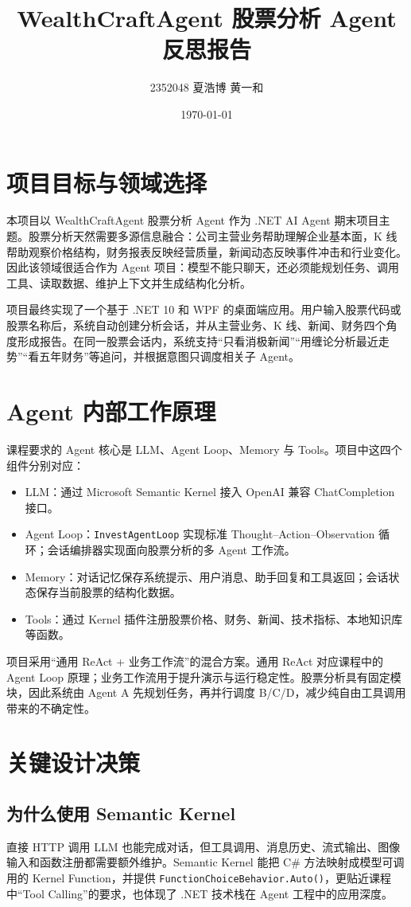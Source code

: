 \documentclass[UTF8,a4paper,11pt]{ctexart}
\title{\heiti WealthCraftAgent 股票分析 Agent 反思报告}
\author{2352048 夏浩博 \quad 2351269 黄一和}
\date{\today}
\begin{document}
\maketitle

\section{项目目标与领域选择}
本项目以 WealthCraftAgent 股票分析 Agent 作为 .NET AI Agent 期末项目主题。股票分析天然需要多源信息融合：公司主营业务帮助理解企业基本面，K 线帮助观察价格结构，财务报表反映经营质量，新闻动态反映事件冲击和行业变化。因此该领域很适合作为 Agent 项目：模型不能只聊天，还必须能规划任务、调用工具、读取数据、维护上下文并生成结构化分析。

项目最终实现了一个基于 .NET 10 和 WPF 的桌面端应用。用户输入股票代码或股票名称后，系统自动创建分析会话，并从主营业务、K 线、新闻、财务四个角度形成报告。在同一股票会话内，系统支持“只看消极新闻”“用缠论分析最近走势”“看五年财务”等追问，并根据意图只调度相关子 Agent。

\section{Agent 内部工作原理}
课程要求的 Agent 核心是 LLM、Agent Loop、Memory 与 Tools。项目中这四个组件分别对应：

\begin{itemize}
  \item LLM：通过 Microsoft Semantic Kernel 接入 OpenAI 兼容 ChatCompletion 接口。
  \item Agent Loop：\texttt{InvestAgentLoop} 实现标准 Thought--Action--Observation 循环；会话编排器实现面向股票分析的多 Agent 工作流。
  \item Memory：对话记忆保存系统提示、用户消息、助手回复和工具返回；会话状态保存当前股票的结构化数据。
  \item Tools：通过 Kernel 插件注册股票价格、财务、新闻、技术指标、本地知识库等函数。
\end{itemize}

项目采用“通用 ReAct + 业务工作流”的混合方案。通用 ReAct 对应课程中的 Agent Loop 原理；业务工作流用于提升演示与运行稳定性。股票分析具有固定模块，因此系统由 Agent A 先规划任务，再并行调度 B/C/D，减少纯自由工具调用带来的不确定性。

\section{关键设计决策}
\subsection{为什么使用 Semantic Kernel}
直接 HTTP 调用 LLM 也能完成对话，但工具调用、消息历史、流式输出、图像输入和函数注册都需要额外维护。Semantic Kernel 能把 C\# 方法映射成模型可调用的 Kernel Function，并提供 \texttt{FunctionChoiceBehavior.Auto()}，更贴近课程中“Tool Calling”的要求，也体现了 .NET 技术栈在 Agent 工程中的应用深度。
\end{document}
